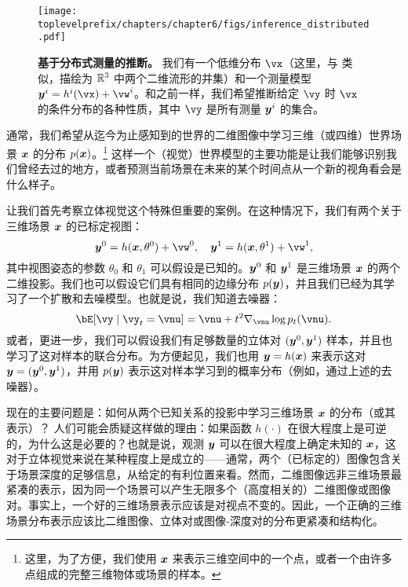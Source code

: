 \documentclass[../../book-main.tex]{subfiles}
\begin{document}
\begin{figure}[t]
  \centering 
  \texttt{[image: \\toplevelprefix/chapters/chapter6/figs/inference\_distributed.pdf]}
  \caption{\small \textbf{基于分布式测量的推断。} 我们有一个低维分布 \(\vx\)（这里，与  类似，描绘为 \(\mathbb{R}^{3}\) 中两个二维流形的并集）和一个测量模型 \(\y^{i} = h^{i}(\vx) + \vw^{i}\)。和之前一样，我们希望推断给定 \(\vy\) 时 \(\vx\) 的条件分布的各种性质，其中 \(\vy\) 是所有测量 \(\bm{y}^{i}\) 的集合。}
  \label{fig:inference_distributed}
\end{figure}

通常，我们希望从迄今为止感知到的世界的二维图像中学习三维（或四维）世界场景 $\bm{x}$ 的分布 $p(\bm{x})$。\footnote{这里，为了方便，我们使用 $\bm{x}$ 来表示三维空间中的一个点，或者一个由许多点组成的完整三维物体或场景的样本。} 这样一个（视觉）世界模型的主要功能是让我们能够识别我们曾经去过的地方，或者预测当前场景在未来的某个时间点从一个新的视角看会是什么样子。

让我们首先考察立体视觉这个特殊但重要的案例。在这种情况下，我们有两个关于三维场景 $\bm{x}$ 的已标定视图：
\begin{equation}
    \y^0 = h(\x, \theta^0) +\vw^0, \quad \y^1 = h(\x, \theta^1) +\vw^1, 
\end{equation}
其中视图姿态的参数 $\theta_0$ 和 $\theta_1$ 可以假设是已知的。$\bm{y}^0$ 和 $\bm{y}^1$ 是三维场景 $\bm{x}$ 的两个二维投影。我们也可以假设它们具有相同的边缘分布 $p(\bm{y})$，并且我们已经为其学习了一个扩散和去噪模型。也就是说，我们知道去噪器：
\begin{equation}
  \bE[\vy \mid \vy_t=\vnu] =
  \vnu + t^2 \nabla_{\vnu}\log p_t(\vnu). 
 \label{eq:y-posterior-sampling-denoiser}    
\end{equation}
或者，更进一步，我们可以假设我们有足够数量的立体对 $(\bm{y}^0, \bm{y}^1)$ 样本，并且也学习了这对样本的联合分布。为方便起见，我们也用 $\bm{y} = h(\bm{x})$ 来表示这对 $\bm{y} = (\bm{y}^0, \bm{y}^1)$，并用 $p(\bm{y})$ 表示这对样本学习到的概率分布（例如，通过上述的去噪器）。

现在的主要问题是：如何从两个已知关系的投影中学习三维场景 $\bm{x}$ 的分布（或其表示）？
人们可能会质疑这样做的理由：如果函数 $h(\cdot)$ 在很大程度上是可逆的，为什么这是必要的？也就是说，观测 $\bm{y}$ 可以在很大程度上确定未知的 $\bm{x}$，这对于立体视觉来说在某种程度上是成立的——通常，两个（已标定的）图像包含关于场景深度的足够信息，从给定的有利位置来看。然而，二维图像远非三维场景最紧凑的表示，因为同一个场景可以产生无限多个（高度相关的）二维图像或图像对。事实上，一个好的三维场景表示应该是对视点不变的。因此，一个正确的三维场景分布表示应该比二维图像、立体对或图像-深度对的分布更紧凑和结构化。
\end{document}
